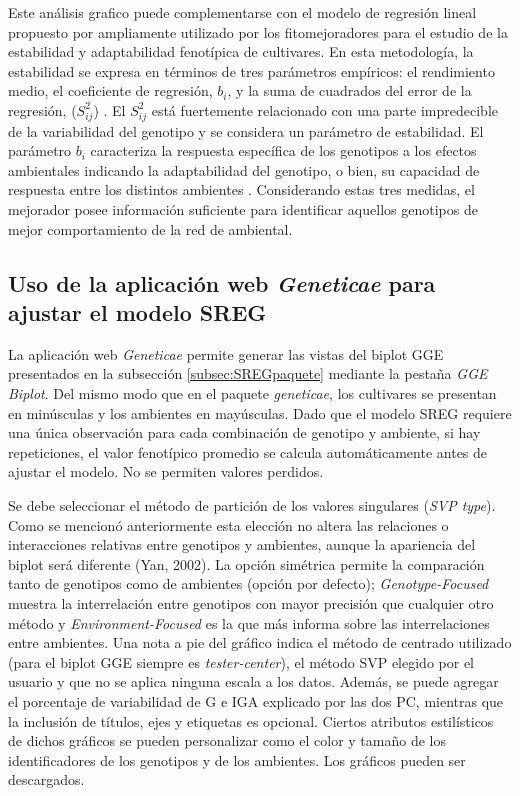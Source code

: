 Este análisis grafico puede complementarse con el modelo de regresión lineal propuesto por \citet{EberhartRussell1966} ampliamente utilizado por los fitomejoradores para el estudio de la estabilidad y adaptabilidad fenotípica de cultivares. En esta metodología, la estabilidad se expresa en términos de tres parámetros empíricos: el rendimiento medio, el coeficiente de regresión, $b_i$, y la suma de cuadrados del error de la regresión, ($S^2_{ij}$) \citep{Crossa1990,Floresetal1998}. El $S^2_{ij}$ está fuertemente relacionado con una parte impredecible de la variabilidad del genotipo y se considera un parámetro de estabilidad. El parámetro $b_i$ caracteriza la respuesta específica de los genotipos a los efectos ambientales indicando la adaptabilidad del genotipo, o bien, su capacidad de respuesta entre los distintos ambientes \citep{Breese1969}. Considerando estas tres medidas, el mejorador posee información suficiente para identificar aquellos genotipos de mejor comportamiento de la red de ambiental.

\subsection{Uso de la aplicación web \emph{Geneticae} para ajustar el modelo SREG}

La aplicación web \emph{Geneticae} permite generar las vistas del biplot GGE presentados en la subsección \ref{subsec:SREGpaquete} mediante la pestaña \emph{GGE Biplot}. Del mismo modo que en el paquete \emph{geneticae}, los cultivares se presentan en minúsculas y los ambientes en mayúsculas. Dado que el modelo SREG requiere una única observación para cada combinación de genotipo y ambiente, si hay repeticiones, el valor fenotípico promedio se calcula automáticamente antes de ajustar el modelo. No se permiten valores perdidos. 

Se debe seleccionar el método de partición de los valores singulares (\emph{SVP type}). Como se mencionó anteriormente esta elección no altera las relaciones o interacciones relativas entre genotipos y ambientes, aunque la apariencia del biplot será diferente (Yan, 2002). La opción simétrica permite la comparación tanto de genotipos como de ambientes (opción por defecto); \emph{Genotype-Focused} muestra la interrelación entre genotipos con mayor precisión que cualquier otro método y \emph{Environment-Focused} es la que más informa sobre las interrelaciones entre ambientes. Una nota a pie del gráfico indica el método de centrado utilizado (para el biplot GGE siempre es \emph{tester-center}), el método SVP elegido por el usuario y que no se aplica ninguna escala a los datos. Además, se puede agregar el porcentaje de variabilidad de G e IGA explicado por las dos PC, mientras que la inclusión de títulos, ejes y etiquetas es opcional. Ciertos atributos estilísticos de dichos gráficos se pueden personalizar como el color y tamaño de los identificadores de los genotipos y de los ambientes. Los gráficos pueden ser descargados.  

